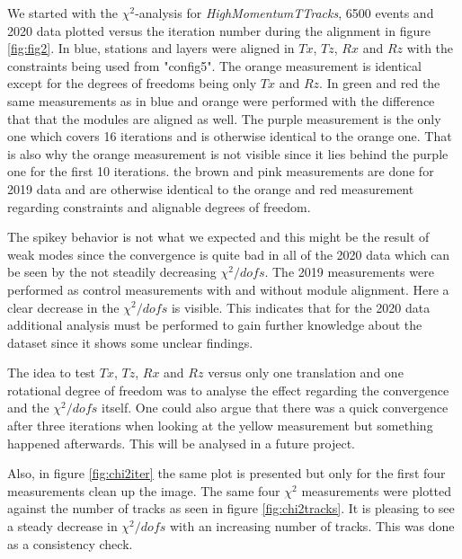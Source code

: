 We started with the $\chi^2$-analysis for \textit{HighMomentumTTracks},
6500 events and 2020 data plotted versus the iteration number during the
alignment in figure \ref{fig:fig2}. In blue, stations and layers were aligned in $Tx$,
$Tz$, $Rx$ and $Rz$ with the constraints being used from "config5". The orange
measurement is identical except for the degrees of freedoms being only $Tx$ and $Rz$.
In green and red the same measurements as in blue and orange were performed with
the difference that that the modules are aligned as well.
The purple measurement is the only one which covers 16 iterations and is otherwise identical to the orange one. That is also why the orange measurement is not visible since it lies behind the purple one for the first 10 iterations.
the brown and pink measurements are done for 2019 data and are otherwise identical to the orange and red measurement regarding constraints and alignable degrees of freedom.

The spikey behavior is not what we expected and this might be the result of weak modes since the convergence is quite bad in all of the 2020 data which can be seen by the not
steadily decreasing $\chi^2 / dofs$.
The 2019 measurements were performed as control measurements with and without
module alignment. Here a clear decrease in the $\chi^2 / dofs$ is visible. This
indicates that for the 2020 data additional analysis must be performed to gain further knowledge about the dataset since it shows some unclear findings.

The idea to test $Tx$, $Tz$, $Rx$ and $Rz$ versus only one translation and one
rotational degree of freedom was to analyse the effect regarding the convergence and the $\chi^2 / dofs$ itself. One could also argue that there was a quick convergence after three iterations when looking at the yellow measurement but something happened afterwards. This will be analysed in a future project.

Also, in figure \ref{fig:chi2iter} the same plot is presented but only for the first four measurements clean up the image. The same four $\chi^2$ measurements were plotted
against the number of tracks as seen in figure \ref{fig:chi2tracks}. It is pleasing to see a steady decrease in $\chi^2 / dofs$ with an increasing number of tracks. This was done as a consistency check.

